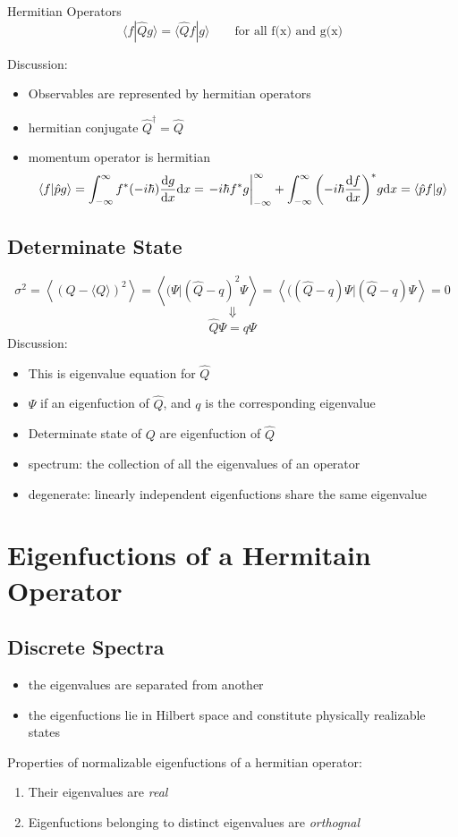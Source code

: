 \begin{dfn}
	Hermitian Operators
	\[\langle f|\hat{Q}g \rangle =\langle \hat{Q}f|g \rangle \qquad \text{for all f(x) and g(x)} \]
\end{dfn}
Discussion:
\begin{itemize}
	\item Observables are represented by hermitian operators
	\item hermitian conjugate \(\hat{Q}^\dag = \hat{Q}\)
	\item momentum operator is hermitian
	\[\braket{f}{\hat{p}g}=\int_{-\infty}^\infty f^*(-i\hbar)\dv{g}{x}\dd x = 
	\eval{-i\hbar f^*g}_{-\infty}^\infty + \int_{-\infty}^\infty \qty(-i\hbar\dv{f}{x})^*g\dd x=
	\braket{\hat{p}f}{g}\]
\end{itemize}

\subsection{Determinate State}

\[ \sigma^2 = \left\langle(Q-\langle Q \rangle)^2\right\rangle = 
\left\langle(\Psi|(\hat{Q}-q)^2\Psi \right\rangle = 
\left\langle((\hat{Q}-q)\Psi|(\hat{Q}-q)\Psi \right\rangle =0\]
\[\Downarrow\]
\[ \hat{Q}\Psi = q\Psi\]
Discussion:
\begin{itemize}
	\item This is eigenvalue equation for \(\hat{Q}\)
	\item \(\Psi\) if an eigenfuction of \(\hat{Q}\), and \(q\) is the corresponding eigenvalue
	\item Determinate state of \(Q\) are eigenfuction of \(\hat{Q}\)
	\item spectrum: the collection of all the eigenvalues of an operator
	\item degenerate: linearly independent eigenfuctions share the same eigenvalue
\end{itemize}
\section{Eigenfuctions of a Hermitain Operator}
\subsection{Discrete Spectra}
\begin{itemize}
	\item the eigenvalues are separated from another
	\item the eigenfuctions lie in Hilbert space and constitute physically realizable states
\end{itemize}
Properties of normalizable eigenfuctions of a hermitian operator:
\begin{enumerate}
	\item Their eigenvalues are \emph{real}
	\item Eigenfuctions belonging to distinct eigenvalues are \emph{orthognal}
\end{enumerate}
